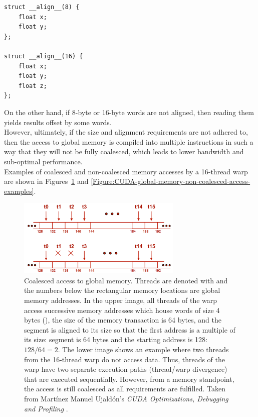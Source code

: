 \begin{lstlisting}[caption={Declaration of to-be-aligned 8- and 16-byte structures. The lower example is aligned to 16 bytes as 12-byte alignment (3 4-byte floats) is not coalesced, therefore, 4 bytes are used for padding. Taken from Nvidia's \emph{CUDA C++ Programming Guide} \cite{NVIDIAMay2022}.},label={Listing:CUDA-aligned-structure-declaration}]
struct __align__(8) {
	float x;
	float y;
};

struct __align__(16) {
	float x;
	float y;
	float z;
};
\end{lstlisting}

On the other hand, if 8-byte or 16-byte words are not aligned, then reading them yields results offset by some words. \\
However, ultimately, if the size and alignment requirements are not adhered to, then the access to global memory is compiled into multiple instructions in such a way that they will not be fully coalesced, which leads to lower bandwidth and sub-optimal performance. \\
Examples of coalesced and non-coalesced memory accesses by a 16-thread warp are shown in Figures~\ref{Figure:CUDA-global-memory-coalesced-access} and \ref{Figure:CUDA-global-memory-non-coalesced-access-examples}.

\begin{figure}[h!]
	\centering
	\includegraphics[width=0.7\textwidth, keepaspectratio]{images/ch1/CUDA_global_memory_coalesced_access.png}
	\caption{Coalesced access to global memory. Threads are denoted with  and the numbers below the rectangular memory locations are global memory addresses. In the upper image, all threads of the warp access successive memory addresses which house words of size 4 bytes (), the size of the memory transaction is 64 bytes, and the segment is aligned to its size so that the first address is a multiple of its size: segment is 64 bytes and the starting address is 128: $ 128/64 = 2 $. The lower image shows an example where two threads from the 16-thread warp do not access data. Thus, threads of the warp have two separate execution paths (thread/warp divergence) that are executed sequentially. However, from a memory standpoint, the access is still coalesced as all requirements are fulfilled. Taken from Martínez Manuel Ujaldón's \emph{CUDA Optimizations, Debugging and Profiling} \cite{xUOrKLpxlGjvTonr}.}
	\label{Figure:CUDA-global-memory-coalesced-access}
\end{figure}

